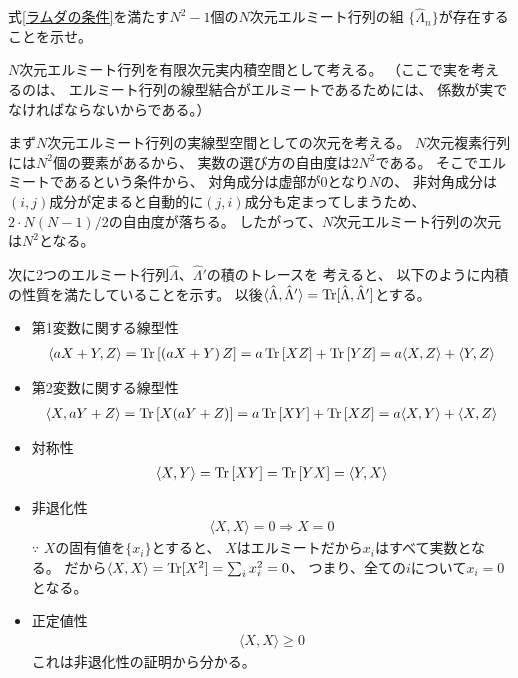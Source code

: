 \documentclass[a4paper, 10pt]{jsarticle}
\begin{document}
\begin{problem}
	式\eqref{ラムダの条件}を満たす$N^2 - 1$個の$N$次元エルミート行列の組
	$\{\hat{\Lambda}_n\}$が存在することを示せ。

	\tcblower

	$N$次元エルミート行列を有限次元実内積空間として考える。
	（ここで実を考えるのは、
	エルミート行列の線型結合がエルミートであるためには、
	係数が実でなければならないからである。）
	
	まず$N$次元エルミート行列の実線型空間としての次元を考える。
	$N$次元複素行列には$N^2$個の要素があるから、
	実数の選び方の自由度は$2N^2$である。
	そこでエルミートであるという条件から、
	対角成分は虚部が0となり$N$の、
	非対角成分は$(i, j)$成分が定まると自動的に$(j, i)$成分も定まってしまうため、
	$2 \cdot N(N-1)/2$の自由度が落ちる。
	したがって、$N$次元エルミート行列の次元は$N^2$となる。

	次に2つのエルミート行列$\hat{\Lambda}$、$\hat{\Lambda}'$の積のトレースを
	考えると、
	以下のように内積の性質を満たしていることを示す。
	以後$\langle \hat{\Lambda}, \hat{\Lambda}' \rangle
	= \operatorname*{Tr} [ \hat{\Lambda}, \hat{\Lambda}']$とする。
	\begin{itemize}
		\item 第1変数に関する線型性
		\begin{align}
			\langle a X + Y, Z \rangle
			= \operatorname*{Tr} \left[ \left( aX + Y \right) Z \right]
			= a\operatorname*{Tr} \left[ XZ \right] + \operatorname*{Tr} \left[ YZ \right]
			= a\langle X, Z \rangle + \langle Y, Z \rangle
		\end{align}
		\item 第2変数に関する線型性
		\begin{align}
			\langle X, aY + Z \rangle
			= \operatorname*{Tr} \left[ X (aY + Z) \right]
			= a\operatorname*{Tr} \left[ XY \right] + \operatorname*{Tr} \left[ XZ \right]
			= a \langle X, Y \rangle + \langle X, Z \rangle
		\end{align}
		\item 対称性
		\begin{align}
			\langle X, Y \rangle
			= \operatorname*{Tr} \left[ XY \right]
			= \operatorname*{Tr} \left[ YX \right]
			= \langle Y, X \rangle
		\end{align}
		\item 非退化性
		\begin{align}
			\langle X, X \rangle = 0 \Rightarrow X = 0
		\end{align}
		$\because$ $X$の固有値を$\{ x_i \}$とすると、
		$X$はエルミートだから$x_i$はすべて実数となる。
		だから$\langle X, X \rangle = \operatorname*{Tr} [X^2] = \sum_i x_i^2 = 0$、
		つまり、全ての$i$について$x_i = 0$となる。
		\item 正定値性
		\begin{align}
			\langle X, X \rangle \geq 0
		\end{align}
		これは非退化性の証明から分かる。
	\end{itemize}


\end{problem}
\end{document}
